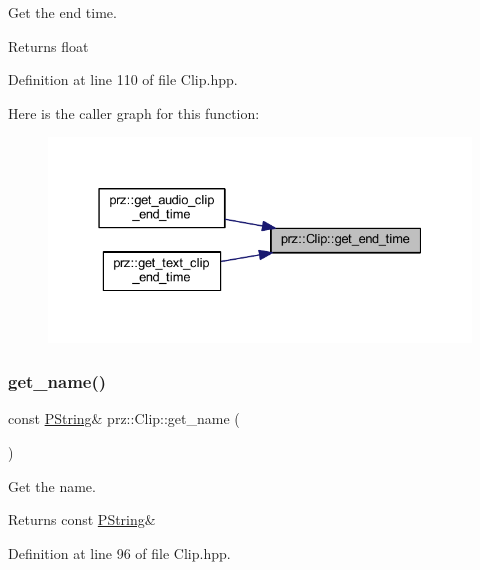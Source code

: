 Get the end time. 

\begin{DoxyReturn}{Returns}
float 
\end{DoxyReturn}


Definition at line 110 of file Clip.\+hpp.

Here is the caller graph for this function\+:
\nopagebreak
\begin{figure}[H]
\begin{center}
\leavevmode
\includegraphics[width=331pt]{classprz_1_1_clip_acfe08e188c11afa8ca32b334907fe9f9_icgraph}
\end{center}
\end{figure}
\mbox{\label{classprz_1_1_clip_accaf42d7a82d41ad70032870981f8d83}} 
\subsubsection{\texorpdfstring{get\_name()}{get\_name()}}
{\footnotesize\ttfamily const \mbox{\hyperlink{classprz_1_1_p_string}{P\+String}}\& prz\+::\+Clip\+::get\+\_\+name (\begin{DoxyParamCaption}{ }\end{DoxyParamCaption})\hspace{0.3cm}{\ttfamily [inline]}}



Get the name. 

\begin{DoxyReturn}{Returns}
const \mbox{\hyperlink{classprz_1_1_p_string}{P\+String}}\& 
\end{DoxyReturn}


Definition at line 96 of file Clip.\+hpp.


